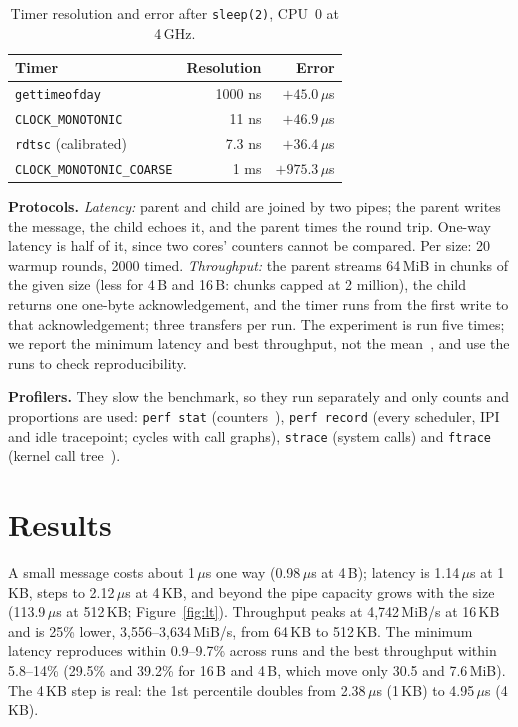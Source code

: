 \documentclass[11pt,twocolumn]{article}
\begin{document}
\begin{table}[t]
\caption{Timer resolution and error after \texttt{sleep(2)}, CPU~0 at 4\,GHz.}
\label{tab:clock}
\footnotesize\centering\setlength{\tabcolsep}{3.5pt}
\begin{tabular}{@{}lrr@{}}
\toprule
Timer & Resolution & Error \\
\midrule
\texttt{gettimeofday} & 1000 ns & $+45.0\,\mu$s \\
\texttt{CLOCK\_MONOTONIC} & 11 ns & $+46.9\,\mu$s \\
\texttt{rdtsc} (calibrated) & 7.3 ns & $+36.4\,\mu$s \\
\texttt{CLOCK\_MONOTONIC\_COARSE} & 1 ms & $+975.3\,\mu$s \\
\bottomrule
\end{tabular}
\end{table}

\textbf{Protocols.} \emph{Latency:} parent and child are joined by two pipes; the parent writes the message, the child echoes it, and the parent times the round trip. One-way latency is half of it, since two cores' counters cannot be compared. Per size: 20 warmup rounds, 2000 timed. \emph{Throughput:} the parent streams 64\,MiB in chunks of the given size (less for 4\,B and 16\,B: chunks capped at 2 million), the child returns one one-byte acknowledgement, and the timer runs from the first write to that acknowledgement; three transfers per run. The experiment is run five times; we report the minimum latency and best throughput, not the mean~\cite{smith,heiser}, and use the runs to check reproducibility.

\textbf{Profilers.} They slow the benchmark, so they run separately and only counts and proportions are used: \texttt{perf stat} (counters~\cite{perf}), \texttt{perf record} (every scheduler, IPI and idle tracepoint; cycles with call graphs), \texttt{strace} (system calls) and \texttt{ftrace} (kernel call tree~\cite{perf}).

\section{Results}
A small message costs about 1\,$\mu$s one way (0.98\,$\mu$s at 4\,B); latency is 1.14\,$\mu$s at 1\,KB, steps to 2.12\,$\mu$s at 4\,KB, and beyond the pipe capacity grows with the size (113.9\,$\mu$s at 512\,KB; Figure~\ref{fig:lt}). Throughput peaks at 4,742\,MiB/s at 16\,KB and is 25\% lower, 3,556--3,634\,MiB/s, from 64\,KB to 512\,KB. The minimum latency reproduces within 0.9--9.7\% across runs and the best throughput within 5.8--14\% (29.5\% and 39.2\% for 16\,B and 4\,B, which move only 30.5 and 7.6\,MiB). The 4\,KB step is real: the 1st percentile doubles from 2.38\,$\mu$s (1\,KB) to 4.95\,$\mu$s (4\,KB).
\end{document}
